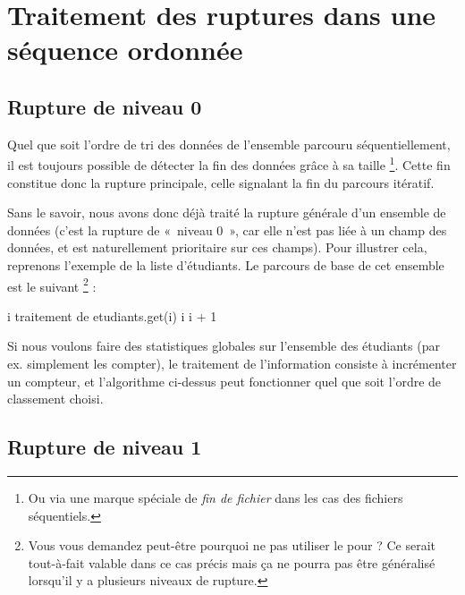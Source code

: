\section{Traitement des ruptures dans une séquence ordonnée}

\subsection*{Rupture de niveau 0}

	Quel que soit l’ordre de tri des données de l'ensemble parcouru séquentiellement, 
	il est toujours possible de détecter la fin des données grâce à sa taille%
	\footnote{%
		Ou via une marque spéciale de \emph{fin de fichier}
		dans les cas des fichiers séquentiels.
	}.
	Cette \og{}fin\fg{} constitue donc la rupture principale, 
	celle signalant la fin du parcours itératif.
	
	Sans le savoir, nous avons donc déjà traité la rupture générale d’un
	ensemble de données (c’est la rupture de «~niveau 0~»,
	car elle n’est pas liée à un champ des données, 
	et est naturellement prioritaire sur ces champs). 
	Pour illustrer cela, reprenons l’exemple de la liste d’étudiants. 
	Le parcours de base de cet ensemble est le suivant%
	\footnote{%
		Vous vous demandez peut-être pourquoi ne pas utiliser le \og{}pour\fg{} ?
		Ce serait tout-à-fait valable dans ce cas précis mais ça ne pourra pas
		être généralisé lorsqu'il y a plusieurs niveaux de rupture.
	} :

	\begin{LDA}
			\Let i 
				\LComment traitement de etudiants.get(i)
				\Let i \Gets i + 1
			\EndWhile
		\EndAlgo
	\end{LDA}

	Si nous voulons faire des statistiques globales sur l’ensemble des
	étudiants (par ex. simplement les compter), le traitement de
	l’information consiste à incrémenter un compteur, et l’algorithme
	ci-dessus peut fonctionner quel que soit l’ordre de classement choisi.

\subsection*{Rupture de niveau 1}

